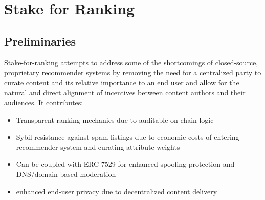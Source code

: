 \section{Stake for Ranking} 
\label{section:ProtocolDescription}

\subsection{Preliminaries}
Stake-for-ranking attempts to address some of the shortcomings of closed-source, proprietary recommender systems by removing the need for a centralized party to curate content and its relative importance to an end user and allow for the natural and direct alignment of incentives between content authors and their audiences. It contributes:
\begin{itemize}
    \item Transparent ranking mechanics due to auditable on-chain logic
    \item Sybil resistance against spam listings due to economic costs of entering recommender system and curating attribute weights
    \item Can be coupled with ERC-7529 \cite{chapman2023erc7529} for enhanced spoofing protection and DNS/domain-based moderation
    \item enhanced end-user privacy due to decentralized content delivery
\end{itemize}

